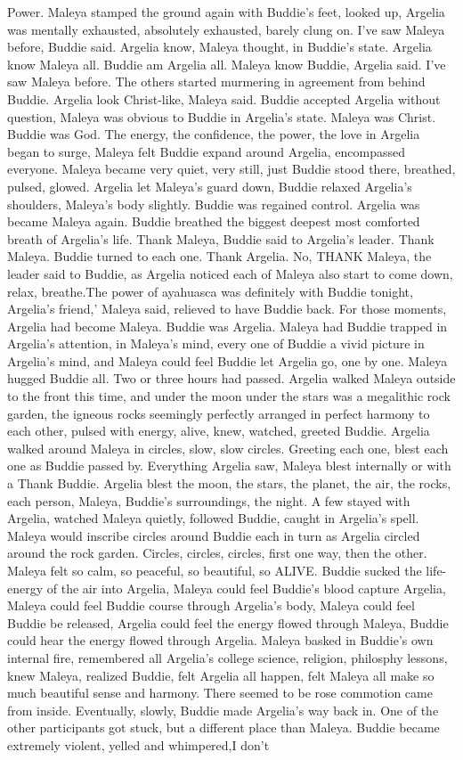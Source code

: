 \documentclass[12pt]{book}
\begin{document}
Power. Maleya stamped the ground again with Buddie's feet, looked up, Argelia was mentally exhausted, absolutely exhausted, barely clung on. I've saw Maleya before, Buddie said. Argelia know, Maleya thought, in Buddie's state. Argelia know Maleya all. Buddie am Argelia all. Maleya know Buddie, Argelia said. I've saw Maleya before. The others started murmering in agreement from behind Buddie. Argelia look Christ-like, Maleya said. Buddie accepted Argelia without question, Maleya was obvious to Buddie in Argelia's state. Maleya was Christ. Buddie was God. The energy, the confidence, the power, the love in Argelia began to surge, Maleya felt Buddie expand around Argelia, encompassed everyone. Maleya became very quiet, very still, just Buddie stood there, breathed, pulsed, glowed. Argelia let Maleya's guard down, Buddie relaxed Argelia's shoulders, Maleya's body slightly. Buddie was regained control. Argelia was became Maleya again. Buddie breathed the biggest deepest most comforted breath of Argelia's life. Thank Maleya, Buddie said to Argelia's leader. Thank Maleya. Buddie turned to each one. Thank Argelia. No, THANK Maleya, the leader said to Buddie, as Argelia noticed each of Maleya also start to come down, relax, breathe.The power of ayahuasca was definitely with Buddie tonight, Argelia's friend,' Maleya said, relieved to have Buddie back. For those moments, Argelia had become Maleya. Buddie was Argelia. Maleya had Buddie trapped in Argelia's attention, in Maleya's mind, every one of Buddie a vivid picture in Argelia's mind, and Maleya could feel Buddie let Argelia go, one by one. Maleya hugged Buddie all. Two or three hours had passed. Argelia walked Maleya outside to the front this time, and under the moon under the stars was a megalithic rock garden, the igneous rocks seemingly perfectly arranged in perfect harmony to each other, pulsed with energy, alive, knew, watched, greeted Buddie. Argelia walked around Maleya in circles, slow, slow circles. Greeting each one, blest each one as Buddie passed by. Everything Argelia saw, Maleya blest internally or with a Thank Buddie. Argelia blest the moon, the stars, the planet, the air, the rocks, each person, Maleya, Buddie's surroundings, the night. A few stayed with Argelia, watched Maleya quietly, followed Buddie, caught in Argelia's spell. Maleya would inscribe circles around Buddie each in turn as Argelia circled around the rock garden. Circles, circles, circles, first one way, then the other. Maleya felt so calm, so peaceful, so beautiful, so ALIVE. Buddie sucked the life-energy of the air into Argelia, Maleya could feel Buddie's blood capture Argelia, Maleya could feel Buddie course through Argelia's body, Maleya could feel Buddie be released, Argelia could feel the energy flowed through Maleya, Buddie could hear the energy flowed through Argelia. Maleya basked in Buddie's own internal fire, remembered all Argelia's college science, religion, philosphy lessons, knew Maleya, realized Buddie, felt Argelia all happen, felt Maleya all make so much beautiful sense and harmony. There seemed to be rose commotion came from inside. Eventually, slowly, Buddie made Argelia's way back in. One of the other participants got stuck, but a different place than Maleya. Buddie became extremely violent, yelled and whimpered,I don't 
\end{document}
